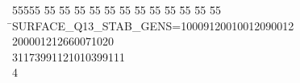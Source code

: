 %
%
\begin{tabbing}
55555 \= 55 \= 55 \= 55 \= 55 \= 55 \= 55 \= 55 \= 55 \= 55 \= 55 \= 55 \= 55 \= \>SURFACE\_Q13\_STAB\_GENS=10009120010012090012\ \\[0pt]
200001212660071020\ \\[0pt]
31173991121010399111\\[0pt]
4\>\end{tabbing}
